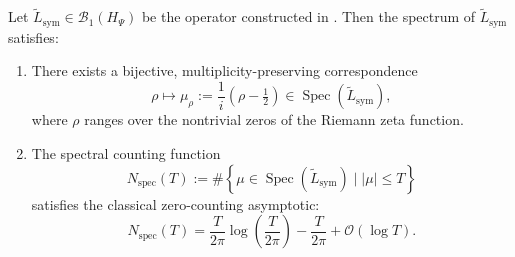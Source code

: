 \begin{theorem}
\label{thm:spectral_bijection_from_trace_asymptotics}
Let $\tilde{L}_{\mathrm{sym}} \in \mathcal{B}_1(H_\Psi)$ be the operator constructed in . Then the spectrum of $\tilde{L}_{\mathrm{sym}}$ satisfies:

\begin{enumerate}
\item There exists a bijective, multiplicity-preserving correspondence
\[
\rho \mapsto \mu_\rho := \frac{1}{i}(\rho - \tfrac{1}{2}) \in \operatorname{Spec}(\tilde{L}_{\mathrm{sym}}),
\]
where $\rho$ ranges over the nontrivial zeros of the Riemann zeta function.

\item The spectral counting function
\[
N_{\mathrm{spec}}(T) := \# \left\{ \mu \in \operatorname{Spec}(\tilde{L}_{\mathrm{sym}}) \mid |\mu| \leq T \right\}
\]
satisfies the classical zero-counting asymptotic:
\[
N_{\mathrm{spec}}(T) = \frac{T}{2\pi} \log \left( \frac{T}{2\pi} \right) - \frac{T}{2\pi} + \mathcal{O}(\log T).
\]
\end{enumerate}
\end{theorem}

